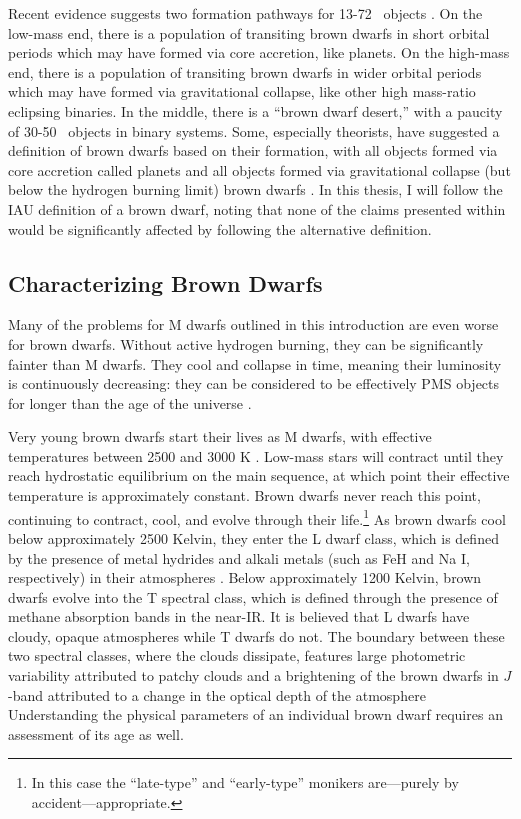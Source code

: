 Recent evidence suggests two formation pathways for 13-72 \mjup\ objects
\citep{Bayliss16}. 
On the low-mass end, there is a population of transiting brown dwarfs in short orbital
periods which may have formed via core accretion, like planets.
On the high-mass end, there is a population of transiting brown dwarfs in wider orbital
periods which may have formed via gravitational collapse, like other high mass-ratio
eclipsing binaries.
In the middle, there is a ``brown dwarf desert,'' with a paucity of 30-50 \mjup\ objects in
binary systems.
Some, especially theorists, have suggested a definition of brown dwarfs based on their
formation, with all objects formed via core accretion called planets and all objects
formed via gravitational collapse (but below the hydrogen burning limit) brown dwarfs
\citep[e.g.][]{Chabrier14}.
In this thesis, I will follow the IAU definition of a brown dwarf, noting that none of the
claims presented within would be significantly affected by following the alternative
definition.

\subsection{Characterizing Brown Dwarfs}

Many of the problems for M dwarfs outlined in this introduction are even worse for
brown dwarfs.
Without active hydrogen burning, they can be significantly fainter than M dwarfs.
They cool and collapse in time, meaning their luminosity is continuously decreasing:
they can be considered to be effectively PMS objects for longer than the age of the 
universe \citep{Burrows01}.

Very young brown dwarfs start their lives as M dwarfs, with effective temperatures between 2500 and
3000 K \citep[See also Figure \ref{fig:burrows}]{Burrows97}.
Low-mass stars will contract until they reach hydrostatic equilibrium on the main sequence, at which point
their effective temperature is approximately constant. 
Brown dwarfs never reach this point, continuing to contract, cool, and evolve through their 
life.\footnote{In this case the ``late-type'' and ``early-type'' monikers are---purely by 
accident---appropriate.}
As brown dwarfs cool below approximately 2500 Kelvin, they enter the L dwarf class, which is defined by
the presence of metal hydrides and alkali metals (such as FeH and Na I, respectively) in their 
atmospheres \citep{Kirkpatrick99}.
Below approximately 1200 Kelvin, brown dwarfs evolve into the T spectral class, which is defined through
the presence of methane absorption bands in the near-IR.
It is believed that L dwarfs have cloudy, opaque atmospheres while T dwarfs do not.
The boundary between these two spectral classes, where the clouds dissipate, features large 
photometric variability attributed to patchy clouds and a brightening of the brown dwarfs in $J$-band
attributed to a change in the optical depth of the atmosphere \citep{Burgasser02b, Metchev15}
Understanding the physical parameters of an individual brown dwarf requires an assessment of its age as well.


